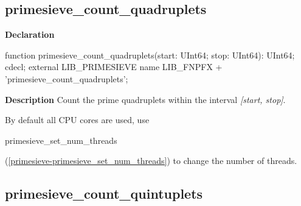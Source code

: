 \documentclass{report}
\newif\ifpdf
\begin{document}
\subsection*{primesieve{\_}count{\_}quadruplets}
\fi
\label{primesieve-primesieve_count_quadruplets}
\begin{list}{}{
\setlength{\itemindent}{0cm}
\setlength{\listparindent}{0cm}
\setlength{\leftmargin}{\evensidemargin}
\addtolength{\leftmargin}{\tmplength}
\settowidth{\labelsep}{X}
\addtolength{\leftmargin}{\labelsep}
\setlength{\labelwidth}{\tmplength}
}
\item[\textbf{Declaration}\hfill]
\ifpdf
\begin{flushleft}
\fi
\begin{ttfamily}
function primesieve{\_}count{\_}quadruplets(start: UInt64; stop: UInt64): UInt64; cdecl; external LIB{\_}PRIMESIEVE name LIB{\_}FNPFX + 'primesieve{\_}count{\_}quadruplets';\end{ttfamily}

\ifpdf
\end{flushleft}
\fi

\par
\item[\textbf{Description}]
Count the prime quadruplets within the interval \textit{[start, stop]}.

By default all CPU cores are used, use \begin{ttfamily}primesieve{\_}set{\_}num{\_}threads\end{ttfamily}(\ref{primesieve-primesieve_set_num_threads}) to change the number of threads.

\end{list}
\ifpdf
\subsection*{\large{\textbf{primesieve{\_}count{\_}quintuplets}}\normalsize\hspace{1ex}\hrulefill}
\else
\end{document}
